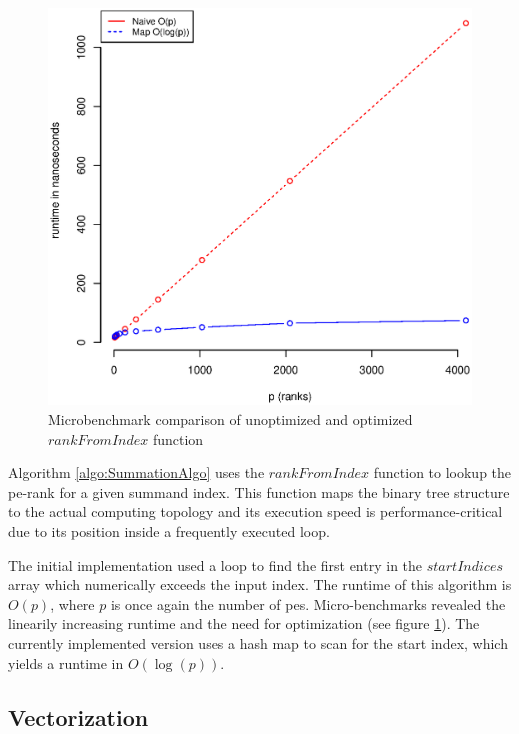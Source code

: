 \begin{figure}
\centering
\includegraphics[scale=0.55]{figures/microbenchmark_rank_from_index.eps}
\caption{Microbenchmark comparison of unoptimized and optimized $rankFromIndex$ function}
\label{fig:microbenchmarkRankFromIndex}

\end{figure}

Algorithm \ref{algo:SummationAlgo} uses the $rankFromIndex$ function to lookup the \gls{pe}-rank for a given summand index. This function
maps the binary tree structure to the actual computing topology and its
execution speed is performance-critical due to its position inside a frequently executed loop.

The initial implementation used a loop to find the first entry
in the $startIndices$ array which numerically exceeds the input index.
The runtime of this algorithm is $O(p)$, where $p$ is once again the number
of \glspl{pe}.
Micro-benchmarks revealed the linearily increasing runtime and the need for optimization (see figure \ref{fig:microbenchmarkRankFromIndex}).
The currently
implemented version uses a hash map to scan for the start index, which yields a runtime in $O(\log(p))$.

\subsection{Vectorization}
\label{sec:Vectorization}

